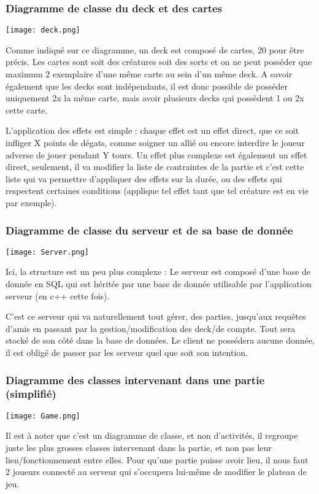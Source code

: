 \documentclass{article}
\begin{document}
		\newpage
		\subsubsection{Diagramme de classe du deck et des cartes}
		\begin{center}\texttt{[image: deck.png]}\end{center}
			Comme indiqué sur ce diagramme, un deck est composé de cartes, 20 pour être précis. Les cartes sont soit des créatures
			soit des sorts et on ne peut posséder que maximum 2 exemplaire d'une même carte au sein d'un même deck.
			A savoir également que les decks sont indépendants, il est donc possible de posséder uniquement 2x la même carte, mais avoir plusieurs decks qui possèdent 1 ou 2x cette carte.

			L'application des effets est simple : chaque effet est un effet direct, que ce soit infliger X points de dégats, comme soigner un allié ou encore interdire le joueur adverse de jouer pendant Y tours.
			Un effet plus complexe est également un effet direct, seulement, il va modifier la liste de contraintes de la partie et c'est cette liste qui va permettre d'appliquer des effets sur la durée, ou des effets qui respectent certaines conditions (applique tel effet tant que tel créature est en vie par exemple).
	
		\newpage
		\subsubsection{Diagramme de classe du serveur et de sa base de donnée}
		\begin{center}\texttt{[image: Server.png]}\end{center}
			Ici, la structure est un peu plus complexe : Le serveur est composé d'une base de donnée en SQL qui est héritée par une base de donnée utilisable par l'application serveur (en c++ cette fois).

			C'est ce serveur qui va naturellement tout gérer, des parties, jusqu'aux requêtes d'amis en passant
			par la gestion/modification des deck/de compte. Tout sera stocké de son côté dans la base de données.
			Le client ne possédera aucune donnée, il est obligé de passer par les serveur quel que soit son intention.


		\newpage
		\subsubsection{Diagramme des classes intervenant dans une partie (simplifié)}
		\begin{center}\texttt{[image: Game.png]}\end{center}
			Il est à noter que c'est un diagramme de classe, et non d'activités, il regroupe juste les plus grosses classes intervenant dans la partie,
			et non pas leur lien/fonctionnement entre elles.
			Pour qu'une partie puisse avoir lieu, il nous faut 2 joueurs connecté au serveur qui s'occupera lui-même de modifier le plateau de jeu.
\end{document}
